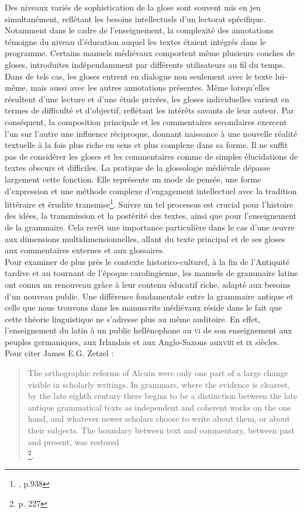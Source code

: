 \documentclass[a4paper, twoside, 12pt]{book}
\begin{document}
Des niveaux variés de sophistication de la glose sont souvent mis en jeu simultanément, reflétant les besoins intellectuels d'un lectorat spécifique. Notamment dans le cadre de l'enseignement, la complexité des annotations témoigne du niveau d'éducation auquel les textes étaient intégrés dans le programme. Certains manuels médiévaux comportent même plusieurs couches de gloses, introduites indépendamment par différents utilisateurs au fil du temps. Dans de tels cas, les gloses entrent en dialogue non seulement avec le texte lui-même, mais aussi avec les autres annotations présentes. Même lorsqu'elles résultent d'une lecture et d'une étude privées, les gloses individuelles varient en termes de difficulté et d'objectif, reflétant les intérêts savants de leur auteur. Par conséquent, la composition principale et les commentaires secondaires exercent l'un sur l'autre une influence réciproque, donnant naissance à une nouvelle réalité textuelle à la fois plus riche en sens et plus complexe dans sa forme. Il ne suffit pas de considérer les gloses et les commentaires comme de simples élucidations de textes obscurs et difficiles. La pratique de la glossologie médiévale dépasse largement cette fonction. Elle représente un mode de pensée, une forme d'expression et une méthode complexe d'engagement intellectuel avec la tradition littéraire et érudite transmise\footnote{\cite{dinkova2020text}, p.938}. Suivre un tel processus est crucial pour l'histoire des idées, la transmission et la postérité des textes, ainsi que pour l'enseignement de la grammaire. Cela revêt une importance particulière dans le cas d'une œuvre aux dimensions multidimensionnelles, allant du texte principal et de ses gloses aux commentaires externes et aux glossaires.\\


Pour examiner de plus près le contexte historico-culturel, à la fin de l'Antiquité tardive et au tournant de l'époque carolingienne, les manuels de grammaire latine ont connu un renouveau grâce à leur contenu éducatif riche, adapté aux besoins d'un nouveau public. Une différence fondamentale entre la grammaire antique et celle que nous trouvons dans les manuscrits médiévaux réside dans le fait que cette théorie linguistique ne s'adresse plus au même auditoire. En effet, l'enseignement du latin à un public hellénophone au \textsc{vi}\ieme{} de son enseignement aux peuples germaniques, aux Irlandais et aux Anglo-Saxons aux\textsc{viii}\ieme{} et \textsc{ix}\ieme{} siècles. Pour citer James E.G. Zetzel : \blockquote{The orthographic reforms of Alcuin were only one part of a large change visible in scholarly writings. In grammars, where the evidence is clearest, by the late eighth century there begins to be a distinction between the late antique grammatical texts as independent and coherent works on the one hand, and whatever newer scholars choose to write about them, or about their subjects. The boundary between text and commentary, between past and present, was restored  \\ \footnote{\cite{zetzel2018critics} p. 227}.}
\end{document}
